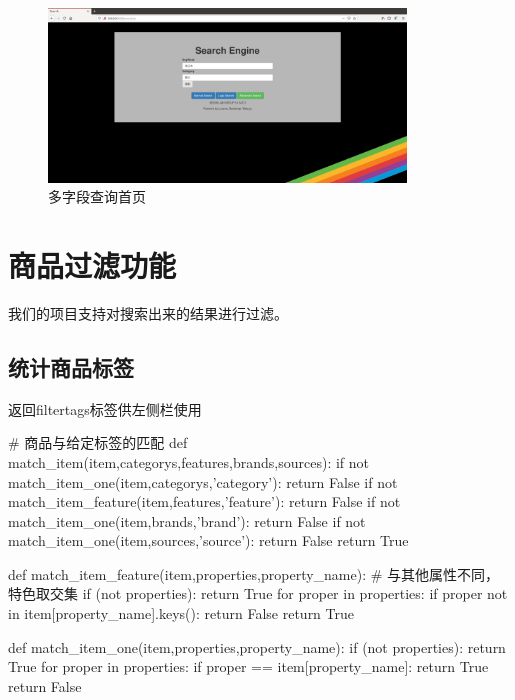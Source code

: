 \begin{figure}[htbp]
\centering
\includegraphics[width=9.5cm]{img/zlt/searchidx3.png}
\caption{多字段查询首页}
\label{fig:zlt_index3}
\end{figure}

\section{商品过滤功能}

我们的项目支持对搜索出来的结果进行过滤。




\subsection{统计商品标签}

返回filtertags标签供左侧栏使用

\begin{python}
# 商品与给定标签的匹配
def match_item(item,categorys,features,brands,sources):
    if not match_item_one(item,categorys,'category'):
        return False
    if not match_item_feature(item,features,'feature'):
        return False
    if not match_item_one(item,brands,'brand'):
        return False
    if not match_item_one(item,sources,'source'):
        return False
    return True

def match_item_feature(item,properties,property_name):
    # 与其他属性不同，特色取交集
    if (not properties):
        return True
    for proper in properties:
        if proper not in item[property_name].keys():
            return False
    return True

def match_item_one(item,properties,property_name):
    if (not properties):
        return True
    for proper in properties:
        if proper == item[property_name]:
            return True
    return False
\end{python}

